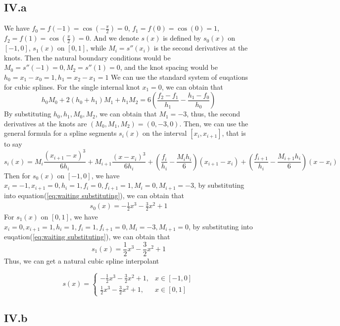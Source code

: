 \documentclass[a4paper]{article}
\begin{document}
\subsection*{IV.a}
We have $f_0=f(-1)=\cos(-\frac{\pi}{2})=0$, $f_1=f(0)=\cos(0)=1$, $f_2=f(1)=\cos(\frac{\pi}{2})=0$. And we denote $s(x)$ is defined by $s_0(x)$ on $[-1,0]$, $s_1(x)$ on $[0,1]$, while $M_i=s''(x_i)$ is the second derivatives at the knots. Then the natural boundary conditions would be $M_0=s''(-1)=0,M_2=s''(1)=0$, and the knot spacing would be $h_0=x_1-x_0=1,h_1=x_2-x_1=1$ 
We can use the standard system of euqations for cubic splines. For the single internal knot $x_1=0$, we can obtain that
\begin{equation}
  h_0M_0+2(h_0+h_1)M_1+h_1M_2=6(\frac{f_2-f_1}{h_1}-\frac{h_1-f_0}{h_0})
\end{equation}
By substituting $h_0,h_1,M_0,M_2$, we can obtain that $M_1=-3$, thus, the second derivatives at the knots are $(M_0,M_1,M_2)=(0,-3,0)$. Then, we can use the general formula for a spline segments $s_i(x)$
on the interval $[x_i,x_{i+1}]$, that is to say
\begin{equation}
  s_i(x)=M_i\frac{(x_{i+1}-x)^3}{6h_i} + M_{i+1}\frac{(x-x_i)^3}{6h_i}+(\frac{f_i}{h_i}-\frac{M_ih_i}{6})(x_{i+1}-x_i)+(\frac{f_{i+1}}{h_i}-\frac{M_{i+1}h_i}{6})(x-x_i) \label{eq:waiting substituting}
\end{equation}
Then for $s_0(x)$ on $[-1,0]$, we have $x_i=-1,x_{i+1}=0, h_i=1,f_i=0,f_{i+1}=1, M_i=0,M_{i+1}=-3$, by substituting into equation(\ref{eq:waiting substituting}), we can obtain that
\begin{eqnarray}
  s_0(x)=-\frac{1}{2}x^3-\frac{3}{2}x^2+1
\end{eqnarray}
For $s_1(x)$ on $[0,1]$, we have $x_i=0,x_{i+1}=1,h_i=1,f_i=1,f_{i+1}=0,M_i=-3,M_{i+1}=0$, by substituting into euqation(\ref{eq:waiting substituting}), we can obtain that 
\begin{equation}
  s_1(x)=\frac{1}{2}x^3-\frac{3}{2}x^2+1
\end{equation}
Thus, we can get a natural cubic spline interpolant 

\begin{equation}
  s(x)=\begin{cases}
    -\frac{1}{2}x^3-\frac{3}{2}x^2+1,&x\in[-1,0]\\
    \frac{1}{2}x^3-\frac{3}{2}x^2+1,&x\in[0,1]
  \end{cases}
\end{equation}


\subsection*{IV.b}
\end{document}
